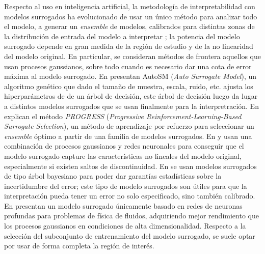 \documentclass[12pt]{report} %
\begin{document}
Respecto al uso en inteligencia artificial, la metodología de interpretabilidad con modelos surrogados ha evolucionado de usar un único método para analizar todo el modelo, a generar un \textit{ensemble} de modelos, calibrados para distintas zonas de la distribución de entrada del modelo a interpretar \cite{Pitra2025}; la potencia del modelo surrogado depende en gran medida de la región de estudio y de la no linearidad del modelo original. En particular, se consideran métodos de frontera aquellos que usan procesos gaussianos, sobre todo cuando es necesario dar una cota de error máxima al modelo surrogado. En \cite{Jia2020} presentan AutoSM (\textit{Auto Surrogate Model}), un algoritmo genético que dado el tamaño de muestra, escala, ruido, etc. ajusta los hiperparámetros de de un árbol de decisión, este árbol de decisión luego da lugar a distintos modelos surrogados que se usan finalmente para la interpretración. En \cite{Hess2013} explican el método \textit{PROGRESS} (\textit{Progressive Reinforcement-Learning-Based Surrogate Selection}), un método de aprendizaje por refuerzo para seleccionar un \textit{ensemble} óptimo a partir de una familia de modelos surrogados. En \cite{Raissi2016DeepMG} y \cite{Kerleguer2024} usan una combinación de procesos gaussianos y redes neuronales para conseguir que el modelo surrogado capture las características no lineales del modelo original, especialmente si existen saltos de discontinuidad. En \cite{Yuan2024} se usan modelos surrogados de tipo árbol bayesiano para poder dar garantías estadísticas sobre la incertidumbre del error; este tipo de modelo surrogados son útiles para que la interpretación pueda tener un error no solo especificado, sino también calibrado. En \cite{Boodaghidizaji2022} presentan un modelo surrogado únicamente basado en redes de neuronas profundas para problemas de física de fluidos, adquiriendo mejor rendimiento que los procesos gaussianos en condiciones de alta dimensionalidad. Respecto a la selección del subconjunto de entrenamiento del modelo surrogado, se suele optar por usar de forma completa la región de interés.
\end{document}
